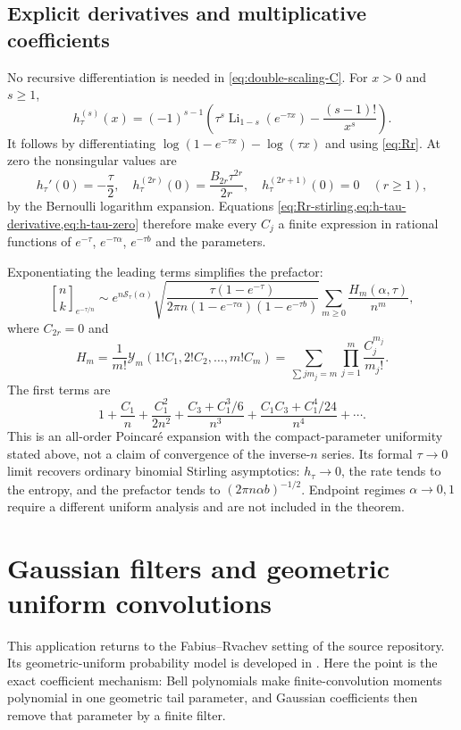 \documentclass[11pt,a4paper]{article}
\numberwithin{equation}{section}
\theoremstyle{definition}
\theoremstyle{remark}
\newcommand{\Gb}[3]{\genfrac{[}{]}{0pt}{}{#1}{#2}_{#3}}
\newcommand{\Li}{\operatorname{Li}}
\newcommand{\Y}{\mathcal Y}
\begin{document}
\subsection{Explicit derivatives and multiplicative coefficients}
No recursive differentiation is needed in \cref{eq:double-scaling-C}.
For $x>0$ and $s\ge1$,
\begin{equation}
 h_\tau^{(s)}(x)=(-1)^{s-1}
  \left(\tau^s\Li_{1-s}(e^{-\tau x})-\frac{(s-1)!}{x^s}\right).
 \label{eq:h-tau-derivative}
\end{equation}
It follows by differentiating
$\log(1-e^{-\tau x})-\log(\tau x)$ and using
\cref{eq:Rr}. At zero the nonsingular values are
\begin{equation}
 h_\tau'(0)=-\frac\tau2,\quad
 h_\tau^{(2r)}(0)=\frac{B_{2r}\tau^{2r}}{2r},\quad
 h_\tau^{(2r+1)}(0)=0\quad(r\ge1),
 \label{eq:h-tau-zero}
\end{equation}
by the Bernoulli logarithm expansion. Equations
\cref{eq:Rr-stirling,eq:h-tau-derivative,eq:h-tau-zero}
therefore make every $C_j$ a finite expression in rational functions
of $e^{-\tau}$, $e^{-\tau\alpha}$, $e^{-\tau b}$ and the parameters.

Exponentiating the leading terms simplifies the prefactor:
\begin{equation}
 \Gb nk{e^{-\tau/n}}
 \sim e^{n\mathscr S_\tau(\alpha)}
     \sqrt{\frac{\tau(1-e^{-\tau})}
         {2\pi n(1-e^{-\tau\alpha})(1-e^{-\tau b})}}
     \sum_{m\ge0}\frac{H_m(\alpha,\tau)}{n^m},
 \label{eq:double-scaling-multiplicative}
\end{equation}
where $C_{2r}=0$ and
\begin{equation}
 H_m=\frac1{m!}\Y_m(1!C_1,2!C_2,\ldots,m!C_m)
    =\sum_{\sum jm_j=m}\prod_{j=1}^m\frac{C_j^{m_j}}{m_j!}.
 \label{eq:double-scaling-H}
\end{equation}
The first terms are
\[
 1+\frac{C_1}{n}+\frac{C_1^2}{2n^2}
   +\frac{C_3+C_1^3/6}{n^3}
   +\frac{C_1C_3+C_1^4/24}{n^4}+\cdots.
\]
This is an all-order Poincar\'e expansion with the compact-parameter
uniformity stated above, not a claim of convergence of the inverse-$n$
series. Its formal $\tau\to0$ limit recovers ordinary binomial Stirling
asymptotics: $h_\tau\to0$, the rate tends to the entropy, and the
prefactor tends to $(2\pi n\alpha b)^{-1/2}$. Endpoint regimes
$\alpha\to0,1$ require a different uniform analysis and are not included
in the theorem.

\section{Gaussian filters and geometric uniform convolutions}
\label{sec:uniform}
This application returns to the Fabius--Rvachev setting of the source
repository. Its geometric-uniform probability model is developed in
\cite{fabiusrepo}. Here the point is the exact coefficient mechanism:
Bell polynomials make finite-convolution moments polynomial in one
geometric tail parameter, and Gaussian coefficients then remove that
parameter by a finite filter.
\end{document}
